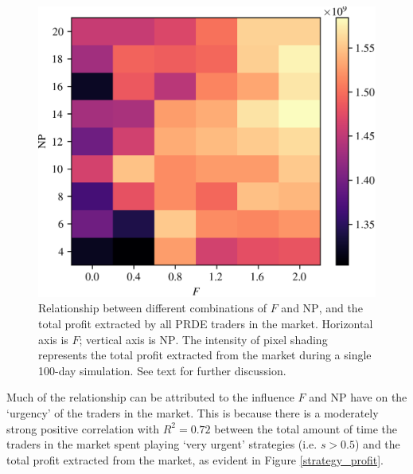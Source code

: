 \documentclass[conference]{IEEEtran}
\begin{document}
\begin{figure}[htbp]
    \centerline{\includegraphics[width=\columnwidth]{profit_grid.png}}
    \caption{
        Relationship between different combinations of $F$ and $\mathrm{NP}$, and the total profit extracted by all PRDE traders in the market.
        Horizontal axis is $F$; vertical axis is $\mathrm{NP}$.
        The intensity of pixel shading represents the total profit extracted from the market during a single 100-day simulation.
        See text for further discussion.
    }
    \label{profit_grid}
\end{figure}

Much of the relationship can be attributed to the influence $F$ and $\mathrm{NP}$ have on the `urgency' of the traders in the market.
This is because there is a moderately strong positive correlation with $R^2=0.72$ between the total amount of time the traders in the market spent playing `very urgent' strategies (i.e. $s>0.5$) and the total profit extracted from the market, as evident in Figure \ref{strategy_profit}.
\end{document}
